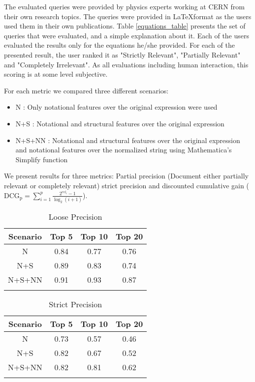 The evaluated queries were provided by physics experts working at CERN from their own research topics. The queries were provided in \LaTeX format as the users used them in their own publications.
Table \ref{equations_table} presents the set of queries that were evaluated, and a simple explanation about it. 
Each of the users evaluated the results only for the equations he/she provided. For each of the presented result, the user ranked it as "Strictly Relevant", "Partially Relevant" and "Completely Irrelevant". As all evaluations including human interaction, this scoring is at some level subjective. 

For each metric we compared three different scenarios:

\begin{itemize}
\item N : Only notational features over the original expression were used
\item N+S : Notational and structural features over the original expression
\item N+S+NN : Notational and structural features over the original expression and notational features over the normalized string using Mathematica's Simplify function
\end{itemize}

We present results for three metrics: Partial precision (Document either partially relevant or completely relevant) strict precision and discounted cumulative gain ($ \mathrm{DCG_{p}} = \sum_{i=1}^{p} \frac{ 2^{rel_{i}} - 1 }{ \log_{2}(i+1)} $).


\begin{longtable}{|c|c|c|c|}
\hline 
\textbf{Scenario} & \textbf{Top 5} & \textbf{Top 10} & \textbf{Top 20} \\ 
\hline 
N & 0.84 & 0.77 & 0.76 \\ 
\hline 
N+S & 0.89 & 0.83 & 0.74 \\ 
\hline 
N+S+NN & 0.91 & 0.93 & 0.87 \\ 
\hline 
\caption{Loose Precision}
\label{loose_precision}
\end{longtable} 

\begin{longtable}{|c|c|c|c|}
\hline 
\textbf{Scenario} & \textbf{Top 5} & \textbf{Top 10} & \textbf{Top 20} \\ 
\hline 
N & 0.73 & 0.57 & 0.46 \\ 
\hline 
N+S & 0.82 & 0.67 & 0.52 \\ 
\hline 
N+S+NN & 0.82 & 0.81 & 0.62 \\ 
\hline 
\caption{Strict Precision}
\label{stric_precision}
\end{longtable} 

